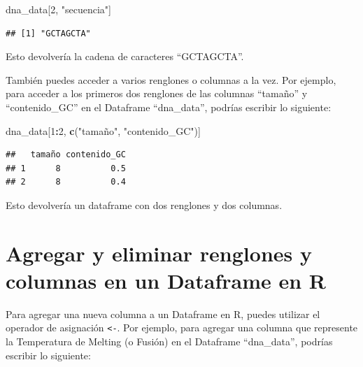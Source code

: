 \documentclass[
]{book}
\newenvironment{Shaded}{\begin{snugshade}}{\end{snugshade}}
\newcommand{\DecValTok}[1]{\textcolor[rgb]{0.00,0.00,0.81}{#1}}
\newcommand{\FunctionTok}[1]{\textcolor[rgb]{0.13,0.29,0.53}{\textbf{#1}}}
\newcommand{\NormalTok}[1]{#1}
\newcommand{\OtherTok}[1]{\textcolor[rgb]{0.56,0.35,0.01}{#1}}
\newcommand{\SpecialCharTok}[1]{\textcolor[rgb]{0.81,0.36,0.00}{\textbf{#1}}}
\newcommand{\StringTok}[1]{\textcolor[rgb]{0.31,0.60,0.02}{#1}}
\begin{document}
\begin{Shaded}
\begin{Highlighting}[]
\NormalTok{dna\_data[}\DecValTok{2}\NormalTok{, }\StringTok{"secuencia"}\NormalTok{]}
\end{Highlighting}
\end{Shaded}

\begin{verbatim}
## [1] "GCTAGCTA"
\end{verbatim}

Esto devolvería la cadena de caracteres ``GCTAGCTA''.

También puedes acceder a varios renglones o columnas a la vez.
Por ejemplo, para acceder a los primeros dos renglones de las columnas ``tamaño'' y ``contenido\_GC'' en el Dataframe ``dna\_data'', podrías escribir lo siguiente:

\begin{Shaded}
\begin{Highlighting}[]
\NormalTok{dna\_data[}\DecValTok{1}\SpecialCharTok{:}\DecValTok{2}\NormalTok{, }\FunctionTok{c}\NormalTok{(}\StringTok{"tamaño"}\NormalTok{, }\StringTok{"contenido\_GC"}\NormalTok{)]}
\end{Highlighting}
\end{Shaded}

\begin{verbatim}
##   tamaño contenido_GC
## 1      8          0.5
## 2      8          0.4
\end{verbatim}

Esto devolvería un dataframe con dos renglones y dos columnas.

\section{Agregar y eliminar renglones y columnas en un Dataframe en R}\label{agregar-y-eliminar-renglones-y-columnas-en-un-dataframe-en-r}

Para agregar una nueva columna a un Dataframe en R, puedes utilizar el operador de asignación \texttt{\textless{}-}.
Por ejemplo, para agregar una columna que represente la Temperatura de Melting (o Fusión) en el Dataframe ``dna\_data'', podrías escribir lo siguiente:

\begin{Shaded}
\end{Shaded}
\end{document}

